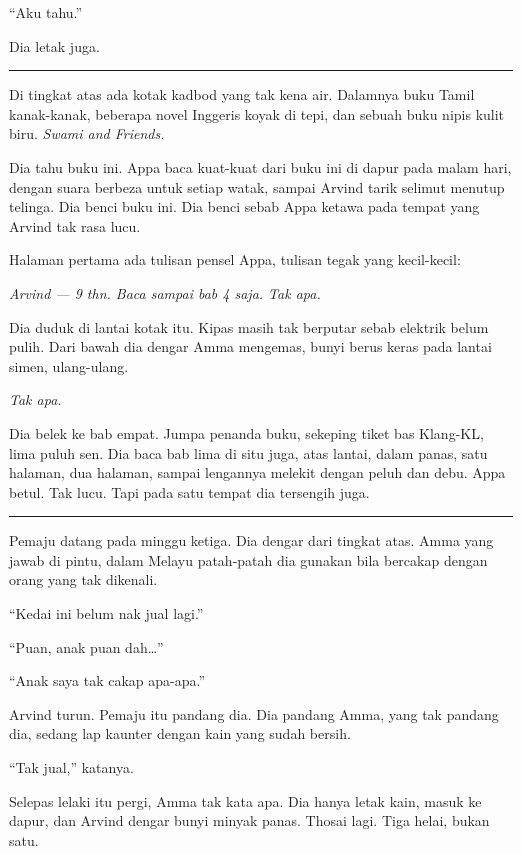 \documentclass[
  11pt,
  a5paper,
  openany,
  oneside]{book}
\begin{document}
``Aku tahu.''

Dia letak juga.

\begin{center}\rule{0.5\linewidth}{0.5pt}\end{center}

Di tingkat atas ada kotak kadbod yang tak kena air. Dalamnya buku Tamil
kanak-kanak, beberapa novel Inggeris koyak di tepi, dan sebuah buku
nipis kulit biru. \emph{Swami and Friends.}

Dia tahu buku ini. Appa baca kuat-kuat dari buku ini di dapur pada malam
hari, dengan suara berbeza untuk setiap watak, sampai Arvind tarik
selimut menutup telinga. Dia benci buku ini. Dia benci sebab Appa ketawa
pada tempat yang Arvind tak rasa lucu.

Halaman pertama ada tulisan pensel Appa, tulisan tegak yang kecil-kecil:

\emph{Arvind --- 9 thn. Baca sampai bab 4 saja. Tak apa.}

Dia duduk di lantai kotak itu. Kipas masih tak berputar sebab elektrik
belum pulih. Dari bawah dia dengar Amma mengemas, bunyi berus keras pada
lantai simen, ulang-ulang.

\emph{Tak apa.}

Dia belek ke bab empat. Jumpa penanda buku, sekeping tiket bas Klang-KL,
lima puluh sen. Dia baca bab lima di situ juga, atas lantai, dalam
panas, satu halaman, dua halaman, sampai lengannya melekit dengan peluh
dan debu. Appa betul. Tak lucu. Tapi pada satu tempat dia tersengih
juga.

\begin{center}\rule{0.5\linewidth}{0.5pt}\end{center}

Pemaju datang pada minggu ketiga. Dia dengar dari tingkat atas. Amma
yang jawab di pintu, dalam Melayu patah-patah dia gunakan bila bercakap
dengan orang yang tak dikenali.

``Kedai ini belum nak jual lagi.''

``Puan, anak puan dah\ldots''

``Anak saya tak cakap apa-apa.''

Arvind turun. Pemaju itu pandang dia. Dia pandang Amma, yang tak pandang
dia, sedang lap kaunter dengan kain yang sudah bersih.

``Tak jual,'' katanya.

Selepas lelaki itu pergi, Amma tak kata apa. Dia hanya letak kain, masuk
ke dapur, dan Arvind dengar bunyi minyak panas. Thosai lagi. Tiga helai,
bukan satu.
\end{document}
